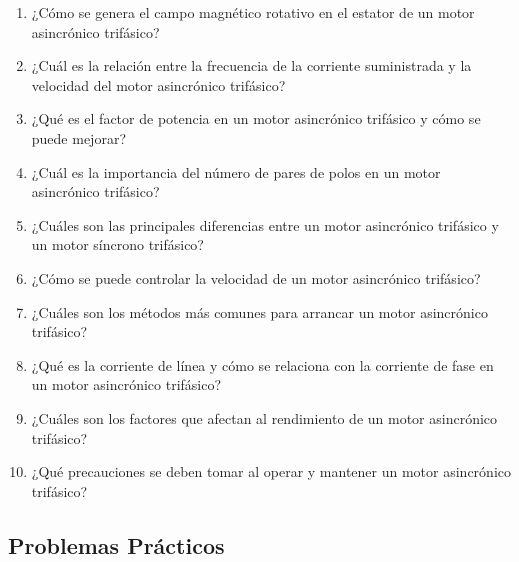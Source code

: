 \documentclass[../main]{subfiles}
\begin{document}
\begin{enumerate}
    \item ¿Cómo se genera el campo magnético rotativo en el estator de un motor asincrónico trifásico?
    \item ¿Cuál es la relación entre la frecuencia de la corriente suministrada y la velocidad del motor asincrónico trifásico?
    \item ¿Qué es el factor de potencia en un motor asincrónico trifásico y cómo se puede mejorar?
    \item ¿Cuál es la importancia del número de pares de polos en un motor asincrónico trifásico?
    \item ¿Cuáles son las principales diferencias entre un motor asincrónico trifásico y un motor síncrono trifásico?
    \item ¿Cómo se puede controlar la velocidad de un motor asincrónico trifásico?
    \item ¿Cuáles son los métodos más comunes para arrancar un motor asincrónico trifásico?
    \item ¿Qué es la corriente de línea y cómo se relaciona con la corriente de fase en un motor asincrónico trifásico?
    \item ¿Cuáles son los factores que afectan al rendimiento de un motor asincrónico trifásico?
    \item ¿Qué precauciones se deben tomar al operar y mantener un motor asincrónico trifásico?
\end{enumerate}
\subsection*{Problemas Prácticos}
\end{document}
